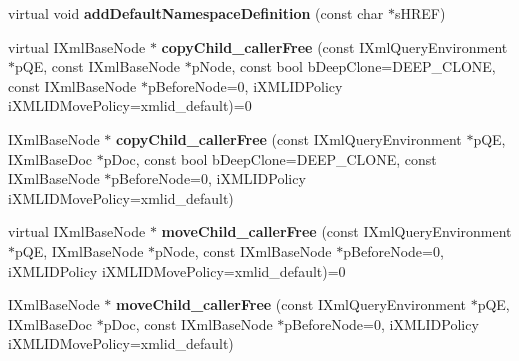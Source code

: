 \begin{DoxyCompactItemize}
\item 
\hypertarget{classgeneral__server_1_1XmlBaseNode_ab993e0a65044d675337822116711a6ee}{virtual void {\bfseries add\-Default\-Namespace\-Definition} (const char $\ast$s\-H\-R\-E\-F)}\label{classgeneral__server_1_1XmlBaseNode_ab993e0a65044d675337822116711a6ee}

\item 
\hypertarget{classgeneral__server_1_1XmlBaseNode_a77b79ba459ad170d67f8925e2095bda0}{virtual \-I\-Xml\-Base\-Node $\ast$ {\bfseries copy\-Child\-\_\-caller\-Free} (const \-I\-Xml\-Query\-Environment $\ast$p\-Q\-E, const \-I\-Xml\-Base\-Node $\ast$p\-Node, const bool b\-Deep\-Clone=\-D\-E\-E\-P\-\_\-\-C\-L\-O\-N\-E, const \-I\-Xml\-Base\-Node $\ast$p\-Before\-Node=0, i\-X\-M\-L\-I\-D\-Policy i\-X\-M\-L\-I\-D\-Move\-Policy=xmlid\-\_\-default)=0}\label{classgeneral__server_1_1XmlBaseNode_a77b79ba459ad170d67f8925e2095bda0}

\item 
\hypertarget{classgeneral__server_1_1XmlBaseNode_a841644896bb12202fa61a04b7a96c318}{\-I\-Xml\-Base\-Node $\ast$ {\bfseries copy\-Child\-\_\-caller\-Free} (const \-I\-Xml\-Query\-Environment $\ast$p\-Q\-E, \-I\-Xml\-Base\-Doc $\ast$p\-Doc, const bool b\-Deep\-Clone=\-D\-E\-E\-P\-\_\-\-C\-L\-O\-N\-E, const \-I\-Xml\-Base\-Node $\ast$p\-Before\-Node=0, i\-X\-M\-L\-I\-D\-Policy i\-X\-M\-L\-I\-D\-Move\-Policy=xmlid\-\_\-default)}\label{classgeneral__server_1_1XmlBaseNode_a841644896bb12202fa61a04b7a96c318}

\item 
\hypertarget{classgeneral__server_1_1XmlBaseNode_ad7c0cca618354cdfda915b632b2b6969}{virtual \-I\-Xml\-Base\-Node $\ast$ {\bfseries move\-Child\-\_\-caller\-Free} (const \-I\-Xml\-Query\-Environment $\ast$p\-Q\-E, \-I\-Xml\-Base\-Node $\ast$p\-Node, const \-I\-Xml\-Base\-Node $\ast$p\-Before\-Node=0, i\-X\-M\-L\-I\-D\-Policy i\-X\-M\-L\-I\-D\-Move\-Policy=xmlid\-\_\-default)=0}\label{classgeneral__server_1_1XmlBaseNode_ad7c0cca618354cdfda915b632b2b6969}

\item 
\hypertarget{classgeneral__server_1_1XmlBaseNode_a525288c55dba6735ab91dbfa245d89b1}{\-I\-Xml\-Base\-Node $\ast$ {\bfseries move\-Child\-\_\-caller\-Free} (const \-I\-Xml\-Query\-Environment $\ast$p\-Q\-E, \-I\-Xml\-Base\-Doc $\ast$p\-Doc, const \-I\-Xml\-Base\-Node $\ast$p\-Before\-Node=0, i\-X\-M\-L\-I\-D\-Policy i\-X\-M\-L\-I\-D\-Move\-Policy=xmlid\-\_\-default)}\label{classgeneral__server_1_1XmlBaseNode_a525288c55dba6735ab91dbfa245d89b1}


\end{DoxyCompactItemize}
